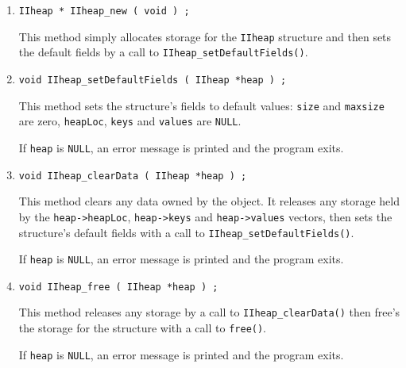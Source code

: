 \begin{enumerate}
\item
\begin{verbatim}
IIheap * IIheap_new ( void ) ;
\end{verbatim}
This method simply allocates storage for the {\tt IIheap} structure 
and then sets the default fields by a call to 
{\tt IIheap\_setDefaultFields()}.
\item
\begin{verbatim}
void IIheap_setDefaultFields ( IIheap *heap ) ;
\end{verbatim}
This method sets the structure's fields to default values:
{\tt size} and {\tt maxsize} are zero,
{\tt heapLoc}, {\tt keys} and {\tt values} are {\tt NULL}.
\par {}
If {\tt heap} is {\tt NULL},
an error message is printed and the program exits.
\item
\begin{verbatim}
void IIheap_clearData ( IIheap *heap ) ;
\end{verbatim}
This method clears any data owned by the object.
It releases any storage held by the {\tt heap->heapLoc},
{\tt heap->keys} and {\tt heap->values} vectors, 
then sets the structure's default fields 
with a call to {\tt IIheap\_setDefaultFields()}.
\par {}
If {\tt heap} is {\tt NULL},
an error message is printed and the program exits.
\item
\begin{verbatim}
void IIheap_free ( IIheap *heap ) ;
\end{verbatim}
This method releases any storage by a call to 
{\tt IIheap\_clearData()} then free's the storage for the 
structure with a call to {\tt free()}.
\par {}
If {\tt heap} is {\tt NULL},
an error message is printed and the program exits.
\end{enumerate}
\par
